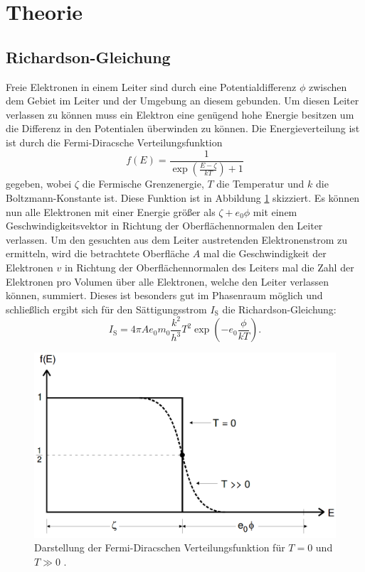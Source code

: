 
\section{Theorie}
\label{sec:Theorie}

\subsection{Richardson-Gleichung}
Freie Elektronen in einem Leiter sind durch eine Potentialdifferenz $\phi$ zwischen dem Gebiet im Leiter und der Umgebung an diesem gebunden. Um diesen Leiter verlassen zu können muss ein Elektron eine genügend hohe Energie besitzen um die Differenz in den Potentialen überwinden zu können. Die Energieverteilung ist ist durch die Fermi-Diracsche Verteilungsfunktion 
\begin{equation}
	f(E) = \frac{1}{\exp\left(\frac{E-\zeta}{k T}\right)+1}
\end{equation} 
gegeben, wobei $\zeta$ die Fermische Grenzenergie, $T$ die Temperatur und $k$ die Boltzmann-Konstante ist. Diese Funktion ist in Abbildung \ref{fig:Fermi-Diracsche} skizziert. Es können nun alle Elektronen mit einer Energie größer als $\zeta + e_0 \phi$ mit einem Geschwindigkeitsvektor in Richtung der Oberflächennormalen den Leiter verlassen. Um den gesuchten aus dem Leiter austretenden Elektronenstrom zu ermitteln, wird die betrachtete Oberfläche $A$ mal die Geschwindigkeit der Elektronen $v$ in Richtung der Oberflächennormalen des Leiters mal die Zahl der Elektronen pro Volumen über alle Elektronen, welche den Leiter verlassen können, summiert. Dieses ist besonders gut im Phasenraum möglich und schließlich ergibt sich für den Sättigungsstrom $I_\text{S}$ die Richardson-Gleichung: 
\begin{equation}
	I_\text{S} = 4 \pi A e_0 m_0 \frac{k^2}{h^3} T^2 \exp\left(-e_0 \frac{\phi}{k T}\right)\text{.}
\end{equation}
\begin{figure}
	\centering
	\includegraphics[width=\linewidth-100pt,height=\textheight-100pt,keepaspectratio]{content/Bilder/Fermi-Diracsche_Verteilung.png}
	\caption{Darstellung der Fermi-Diracschen Verteilungsfunktion für $T=0$ und $T\gg0$ \cite{V504}.}
	\label{fig:Fermi-Diracsche}
\end{figure}

